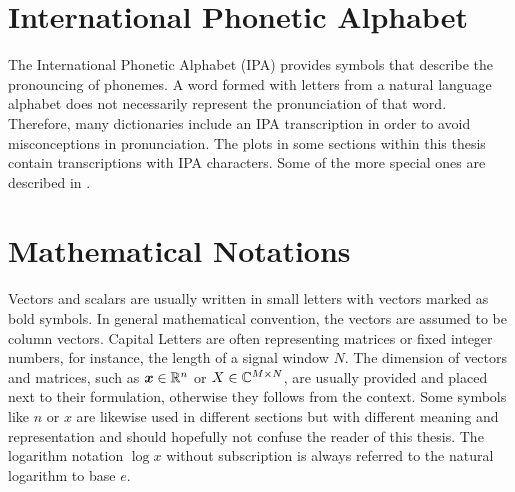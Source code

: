 
\section{International Phonetic Alphabet}\label{sec:appendix_ipa}
The International Phonetic Alphabet (IPA) provides symbols that describe the pronouncing of phonemes.
A word formed with letters from a natural language alphabet does not necessarily represent the pronunciation of that word.
Therefore, many dictionaries include an IPA transcription in order to avoid misconceptions in pronunciation.
The plots in some sections within this thesis contain transcriptions with IPA characters.
Some of the more special ones are described in .




\section{Mathematical Notations}\label{sec:appendix_math}
Vectors and scalars are usually written in small letters with vectors marked as bold symbols.
In general mathematical convention, the vectors are assumed to be column vectors.
Capital Letters are often representing matrices or fixed integer numbers, for instance, the length of a signal window $N$.
The dimension of vectors and matrices, such as $\bm{x} \in \mathbb{R}^n$ or $X \in \mathbb{C}^{M \times N}$, are usually provided and placed next to their formulation, otherwise they follows from the context.
Some symbols like $n$ or $x$ are likewise used in different sections but with different meaning and representation and should hopefully not confuse the reader of this thesis.
The logarithm notation $\log x$ without subscription is always referred to the natural logarithm to base $e$.